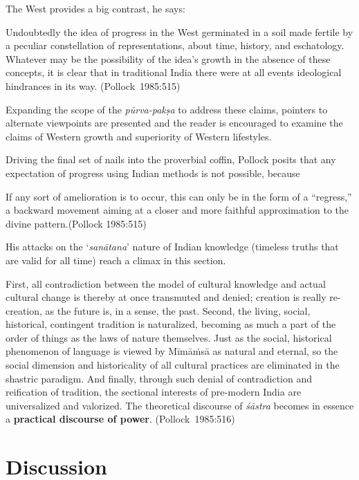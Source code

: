 The West provides a big contrast, he says: 
\begin{myquote}
Undoubtedly the idea of progress in the West germinated in a soil made fertile by a peculiar constellation of representations, about time, history, and eschatology. Whatever may be the possibility of the idea's growth in the absence of these concepts, it is clear that in traditional India there were at all events ideological hindrances in its way.	
\hfill \hbox{(Pollock 1985:515)}
\end{myquote}

Expanding the scope of the {\sl pūrva-pakṣa} to address these claims, pointers to alternate viewpoints are presented and the reader is encouraged to examine the claims of Western growth and superiority of Western lifestyles. 

Driving the final set of nails into the proverbial coffin, Pollock posits that any expectation of progress using Indian methods is not possible, because
\begin{myquote}
If any sort of amelioration is to occur, this can only be in the form of a ``regress,'' a backward movement aiming at a closer and more faithful approximation to the divine pattern.\hfill (Pollock 1985:515)
\end{myquote}

His attacks on the `{\sl sanātana}' nature of Indian knowledge (timeless truths that are valid for all time) reach a climax in this section.
\begin{myquote}
First, all contradiction between the model of cultural knowledge and actual cultural change is thereby at once transmuted and denied; creation is really re-creation, as the future is, in a sense, the past. Second, the living, social, historical, contingent tradition is naturalized, becoming as much a part of the order of things as the laws of nature themselves. Just as the social, historical phenomenon of language is viewed by Mīmāṁsā as natural and eternal, so the social dimension and historicality of all cultural practices are eliminated in the shastric paradigm. And finally, through such denial of contradiction and reification of tradition, the sectional interests of pre-modern India are universalized and valorized. The theoretical discourse of {\sl śāstra} becomes in essence a {\bf practical discourse of power}.
\hfill \hbox{(Pollock 1985:516)}
\end{myquote}

\section*{Discussion}

